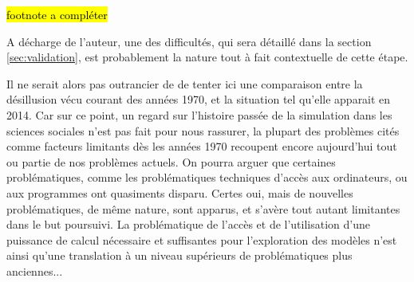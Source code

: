 
\hl{footnote a compléter}


A décharge de l'auteur, une des difficultés, qui sera détaillé dans la section \ref{sec:validation}, est probablement la nature tout à fait contextuelle de cette étape. 

Il ne serait alors pas outrancier de de tenter ici une comparaison entre la désillusion vécu courant des années 1970, et la situation tel qu'elle apparait en 2014. Car sur ce point, un regard sur l'histoire passée de la simulation dans les sciences sociales n'est pas fait pour nous rassurer, la plupart des problèmes cités comme facteurs limitants dès les années 1970 recoupent encore aujourd'hui tout ou partie de nos problèmes actuels. On pourra arguer que certaines problématiques, comme les problématiques techniques d'accès aux ordinateurs, ou aux programmes ont quasiments disparu. Certes oui, mais de nouvelles problématiques, de même nature, sont apparus, et s'avère tout autant limitantes dans le but poursuivi. La problématique de l'accès et de l'utilisation d'une puissance de calcul nécessaire et suffisantes pour l'exploration des modèles n'est ainsi qu'une translation à un niveau supérieurs de problématiques plus anciennes...




